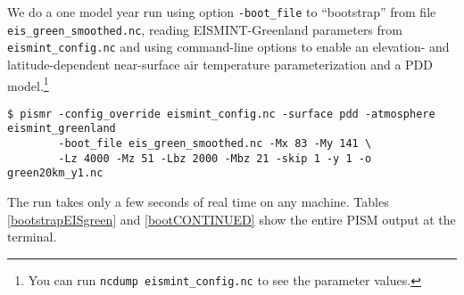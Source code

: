 We do a one model year run using option \texttt{-boot_file} to ``bootstrap'' from file \texttt{eis_green_smoothed.nc}, reading EISMINT-Greenland parameters from \texttt{eismint_config.nc} and using command-line options to enable an elevation- and latitude-dependent near-surface air temperature parameterization and a PDD model.\footnote{You can run \texttt{ncdump eismint_config.nc} to see the parameter values.}

\begin{verbatim}
$ pismr -config_override eismint_config.nc -surface pdd -atmosphere eismint_greenland
        -boot_file eis_green_smoothed.nc -Mx 83 -My 141 \
        -Lz 4000 -Mz 51 -Lbz 2000 -Mbz 21 -skip 1 -y 1 -o green20km_y1.nc
\end{verbatim}%
\noindent The run takes only a few seconds of real time on any machine.  Tables \ref{bootstrapEISgreen} and \ref{bootCONTINUED} show the entire PISM output at the terminal.

